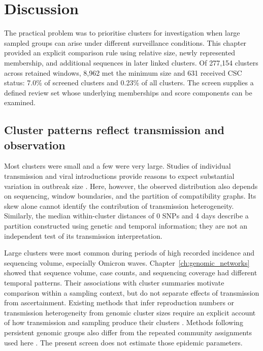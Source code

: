 \section{Discussion}\label{sec:ch5_discussion}

The practical problem was to prioritise clusters for investigation when large sampled groups can arise under different surveillance conditions. This chapter provided an explicit comparison rule using relative size, newly represented membership, and additional sequences in later linked clusters. Of 277,154 clusters across retained windows, 8,962 met the minimum size and 631 received CSC status: 7.0\% of screened clusters and 0.23\% of all clusters. The screen supplies a defined review set whose underlying memberships and score components can be examined.

\subsection{Cluster patterns reflect transmission and observation}\label{sec:ch5_cluster_patterns}

Most clusters were small and a few were very large. Studies of individual transmission and viral introductions provide reasons to expect substantial variation in outbreak size \citep{LloydSmith2005,Endo2020,daSilvaFilipe2020,duPlessis2021,GomezCarballa2021}. Here, however, the observed distribution also depends on sequencing, window boundaries, and the partition of compatibility graphs. Its skew alone cannot identify the contribution of transmission heterogeneity. Similarly, the median within-cluster distances of 0 SNPs and 4 days describe a partition constructed using genetic and temporal information; they are not an independent test of its transmission interpretation.

Large clusters were most common during periods of high recorded incidence and sequencing volume, especially Omicron waves. Chapter~\ref{ch:genomic_networks} showed that sequence volume, case counts, and sequencing coverage had different temporal patterns. Their associations with cluster summaries motivate comparison within a sampling context, but do not separate effects of transmission from ascertainment. Existing methods that infer reproduction numbers or transmission heterogeneity from genomic cluster sizes require an explicit account of how transmission and sampling produce their clusters \citep{TranKiem2024}. Methods following persistent genomic groups also differ from the repeated community assignments used here \citep{dor2025}. The present screen does not estimate those epidemic parameters.

